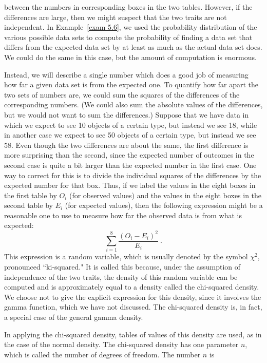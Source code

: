 \begin{example}
between the numbers in corresponding boxes in the two tables.  However, if the
differences are large, then we might suspect that the two traits are not
independent.  In Example~\ref{exam 5.6}, we used the probability distribution of the
various possible data sets to compute the probability of finding a data set that
differs from the expected data set by at least as much as the actual data set does. 
We could do the same in this case, but the amount of computation is enormous.
\par
Instead, we will describe a single number which does a good job of measuring how far
a given data set is from the expected one.  To quantify how far apart the two sets of
numbers are, we could sum the squares of the differences of the corresponding
numbers.  (We could also sum the absolute values of the differences, but we would not
want to sum the differences.)   Suppose that we have data in which we expect to see
10 objects of a certain type, but instead we see 18, while in another case we expect
to see 50 objects of a certain type, but instead we see 58.  Even though the two
differences are about the same, the first difference is more surprising than the second,
since the expected number of outcomes in the second case is quite a bit larger than the
expected number in the first case.  One way to correct for this is to divide the individual
squares of the differences by the expected number for that box.  Thus, if we label the
values in the eight boxes in the first table by $O_i$ (for observed values) and the values
in the eight boxes in the second table by $E_i$ (for expected values), then the following
expression might be a reasonable one to use to measure how far the observed data is
from what is expected:
$$\sum_{i = 1}^8 \frac{(O_i - E_i)^2}{E_i}\ .$$
This expression is a random variable, which is usually denoted by the symbol
$\chi^2$, pronounced ``ki-squared."  It is called this because, under the assumption
of independence of the two traits, the density of this random variable can be
computed and is approximately equal to a density called
the chi-squared density.  We choose not to give the explicit expression for this
density, since it involves the gamma function, which we have not discussed.  The chi-squared
density is, in fact, a special case of the general gamma density. 
\par
In applying the chi-squared density, tables of values of this density are used, as in
the case of the normal density.  The chi-squared density has one parameter $n$, which
is called the number of degrees of freedom.  The number $n$ is

\end{example}
